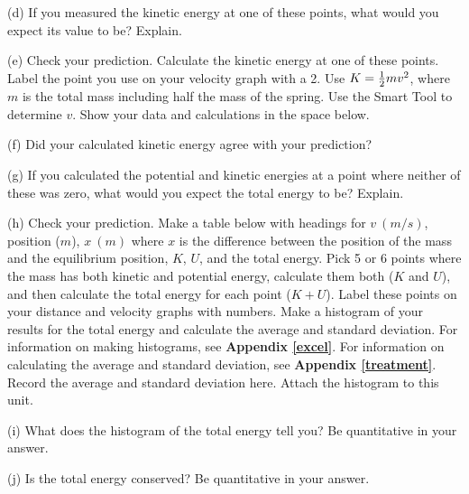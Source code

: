 (d) If you measured the kinetic energy at one of these points, what would you
expect its value to be? Explain.
\vspace{20mm}

\newpage
(e) Check your prediction. Calculate the kinetic energy at one of these points.
Label the point you use on your velocity graph with a 2. Use 
$K = {1\over 2} mv^{2}$, where $m$ is the total mass including half the mass of 
the spring. Use the Smart Tool to determine $v$. Show your data and 
calculations in the space below.
\vspace{20mm}

(f) Did your calculated kinetic energy agree with your prediction?
\vspace{15mm}

(g) If you calculated the potential and kinetic energies at a point where 
neither of these was zero, what would you expect the total energy to be? 
Explain.
\vspace{20mm}

(h) Check your prediction. Make a table below with headings for $v~(m/s)$, 
position ($m$), $x~(m)$ where $x$ is the difference between the position
of the mass and the equilibrium position, $K$, $U$, and the total energy.
Pick 5 or 6 points where the mass has both kinetic and
potential energy, calculate them both ($K$ and $U$), and then calculate the 
total energy for each point ($K+U$). Label these points on your distance
and velocity graphs with numbers. 
Make a histogram of your results for the total energy and calculate the 
average and standard deviation.
For information on making histograms, see \textbf{Appendix \ref{excel}}. For information 
on calculating the average and standard deviation, see \textbf{Appendix \ref{treatment}}. 
Record the average and standard deviation here.
Attach the histogram to this unit.
\vspace{60mm}

(i) What does the histogram of the total energy tell you? Be quantitative in 
your answer.
\vspace{20mm}

(j) Is the total energy conserved?  Be quantitative in your answer.

